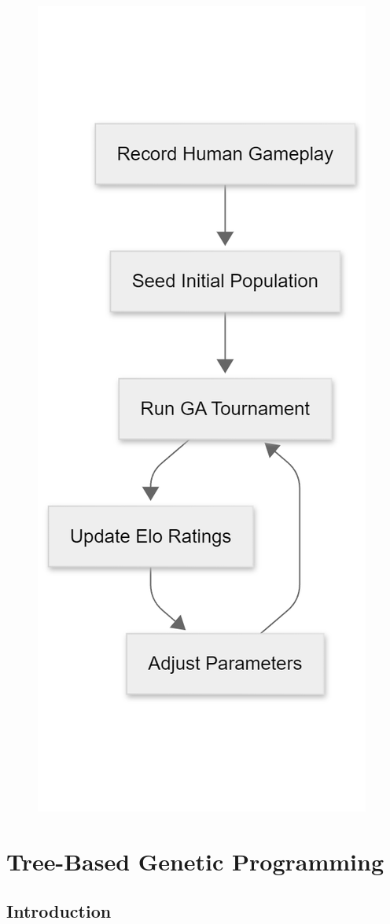 \documentclass[sigconf]{acmart} %
\begin{document}
\begin{figure}
	\centering
	\includegraphics[width=0.7\linewidth]{pictures/workflow}
	\caption[Critical path for future work]{}
	\label{fig:workflow}
\end{figure}

\section{Tree-Based Genetic Programming}
\subsection{Introduction}
\end{document}
